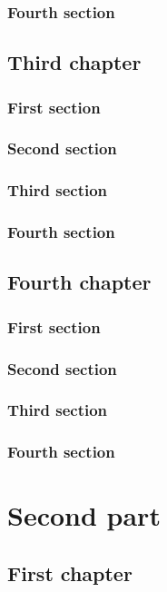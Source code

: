\documentclass{researchbook}
\theoremstyle{plain}
\theoremstyle{definition}
\theoremstyle{remark}
\begin{document}
\section{Fourth section}\lipsum


\chapter{Third chapter}

\section{First section}\lipsum
\section{Second section}\lipsum
\section{Third section}\lipsum
\section{Fourth section}\lipsum


\chapter{Fourth chapter}

\section{First section}\lipsum
\section{Second section}\lipsum
\section{Third section}\lipsum
\section{Fourth section}\lipsum


\part{Second part}
\chapter{First chapter}
\end{document}
